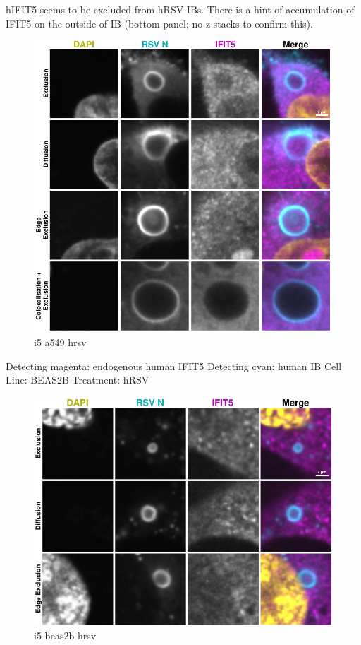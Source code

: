 hIFIT5 seems to be excluded from hRSV IBs. There is a hint of accumulation of IFIT5 on the outside of IB (bottom panel; no z stacks to confirm this). 

\begin{figure}
    \centering
    \includegraphics[width=1\linewidth]{09. Chapter 4/Figs/02. Infection/07. a549 i5.pdf}
    \caption[i5 a549 hrsv]{i5 a549 hrsv}
    \label{fig:i5 a549 hrsv}
\end{figure}

Detecting magenta: endogenous human IFIT5 \newline
Detecting cyan: human IB \newline
Cell Line: BEAS2B \newline
Treatment: hRSV \newline

\begin{figure}
    \centering
    \includegraphics[width=1\linewidth]{09. Chapter 4/Figs/02. Infection/08. beas2b i5.pdf}
    \caption[i5 beas2b hrsv]{i5 beas2b hrsv}
    \label{fig:i5 beas2b hrsv}
\end{figure}

